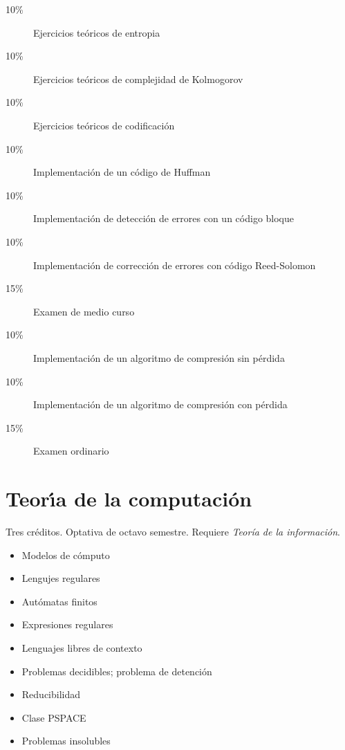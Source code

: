 \documentclass{article}
\begin{document}
\begin{multicols}{4}
\begin{description}
\item[10\%]{Ejercicios te\'{o}ricos de entropia}
\item[10\%]{Ejercicios te\'{o}ricos de complejidad de Kolmogorov}
\item[10\%]{Ejercicios te\'{o}ricos de codificaci\'{o}n}
\item[10\%]{Implementaci\'{o}n de un c\'{o}digo de Huffman}
\item[10\%]{Implementaci\'{o}n de detecci\'{o}n de errores con un c\'{o}digo bloque}
\item[10\%]{Implementaci\'{o}n de correcci\'{o}n de errores con c\'{o}digo Reed-Solomon}      
\item[15\%]{Examen de medio curso}  
\item[10\%]{Implementaci\'{o}n de un algoritmo de compresi\'{o}n sin p\'{e}rdida}
\item[10\%]{Implementaci\'{o}n de un algoritmo de compresi\'{o}n con p\'{e}rdida}  
\item[15\%]{Examen ordinario}
\end{description}  

\vfill\null \columnbreak

\hypertarget{tdc}{\section*{Teor\'{\i}a de la computaci\'{o}n}}

Tres cr\'{e}ditos. Optativa de octavo semestre. Requiere
{\em Teor\'{i}a de la informaci\'{o}n}.

\begin{itemize}
\item{Modelos de c\'{o}mputo}
\item{Lengujes regulares}
\item{Aut\'{o}matas finitos}
\item{Expresiones regulares}
\item{Lenguajes libres de contexto}
\item{Problemas decidibles; problema de detenci\'{o}n}
\item{Reducibilidad}
\item{Clase PSPACE}
\item{Problemas insolubles}
\end{itemize}


\end{multicols}
\end{document}
